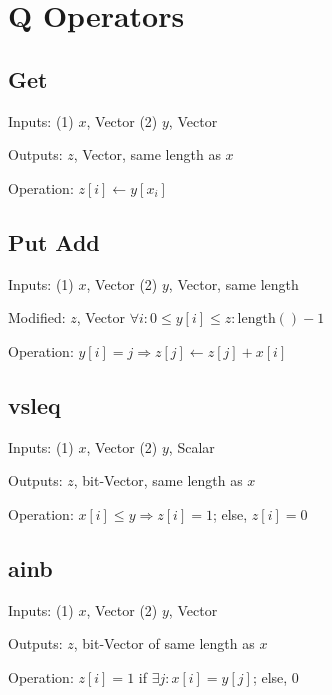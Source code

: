 \section{Q Operators}

\subsection{Get}
\bi
\item Inputs: (1) \(x\), Vector  (2) \(y\), Vector

\item Outputs: \(z\), Vector, same length as \(x\)

\item Operation: \(z[i] \leftarrow y[x_i]\)
\ei

\subsection{Put Add}
\bi
\item Inputs: (1) \(x\), Vector  (2) \(y\), Vector, same length

\item Modified: \(z\), Vector \(\forall i: 0 \leq y[i] \leq z:\mathrm{length}() - 1\)

\item Operation: \(y[i] = j \Rightarrow z[j] \leftarrow z[j] + x[i]\)
\ei


\subsection{vsleq}
\bi
\item Inputs: (1) \(x\), Vector  (2) \(y\), Scalar

\item Outputs: \(z\), bit-Vector, same length as \(x\)

\item Operation: \(x[i] \leq y \Rightarrow z[i] = 1\); else, \(z[i] = 0\)
\ei

\subsection{ainb}
\bi
\item Inputs: (1) \(x\), Vector  (2) \(y\), Vector

\item Outputs: \(z\), bit-Vector of same length as \(x\)

\item Operation: \(z[i] = 1\) if \(\exists j: x[i] = y[j]\); else, 0

